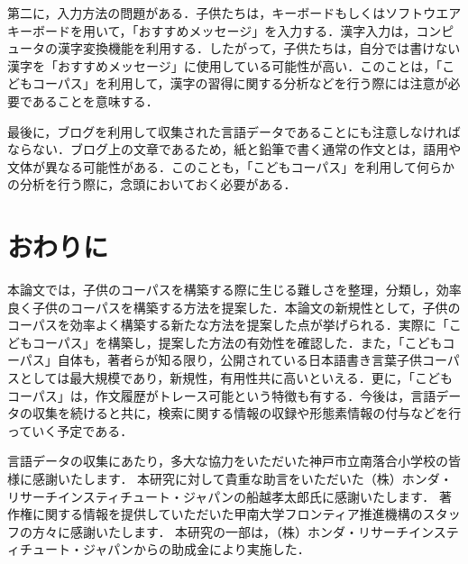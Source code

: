 \documentclass[japanese]{jnlp_1.4}
\begin{document}
  第二に，入力方法の問題がある．子供たちは，キーボードもしくはソフトウエアキーボードを用いて，「おすすめメッセージ」を入力する．漢字入力は，コンピュータの漢字変換機能を利用する．したがって，子供たちは，自分では書けない漢字を「おすすめメッセージ」に使用している可能性が高い．このことは，「こどもコーパス」を利用して，漢字の習得に関する分析などを行う際には注意が必要であることを意味する．


  最後に，ブログを利用して収集された言語データであることにも注意しなければならない．ブログ上の文章であるため，紙と鉛筆で書く通常の作文とは，語用や文体が異なる可能性がある．このことも，「こどもコーパス」を利用して何らかの分析を行う際に，念頭においておく必要がある．



\section{おわりに}\label{sec:conclusions}

  本論文では，子供のコーパスを構築する際に生じる難しさを整理，分類し，効率良く子供のコーパスを構築する方法を提案した．本論文の新規性として，子供のコーパスを効率よく構築する新たな方法を提案した点が挙げられる．実際に「こどもコーパス」を構築し，提案した方法の有効性を確認した．また，「こどもコーパス」自体も，著者らが知る限り，公開されている日本語書き言葉子供コーパスとしては最大規模であり，新規性，有用性共に高いといえる．更に，「こどもコーパス」は，作文履歴がトレース可能という特徴も有する．今後は，言語データの収集を続けると共に，検索に関する情報の収録や形態素情報の付与などを行っていく予定である．


\acknowledgment
言語データの収集にあたり，多大な協力をいただいた神戸市立南落合小学校の皆様に感謝いたします．
本研究に対して貴重な助言をいただいた（株）ホンダ・リサーチインスティチュート・ジャパンの船越孝太郎氏に感謝いたします．
著作権に関する情報を提供していただいた甲南大学フロンティア推進機構のスタッフの方々に感謝いたします．
本研究の一部は，（株）ホンダ・リサーチインスティチュート・ジャパンからの助成金により実施した．
\end{document}
